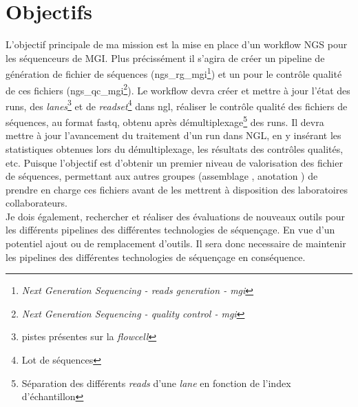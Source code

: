 \section{Objectifs}
L'objectif principale de ma mission est la mise en place d'un workflow NGS pour les séquenceurs de MGI. Plus précissément il s'agira de créer un pipeline de génération de fichier de séquences (ngs\_rg\_mgi\footnote{\emph{Next Generation Sequencing - reads generation - mgi}}) et un pour le contrôle qualité de ces fichiers (ngs\_qc\_mgi\footnote{\emph{Next Generation Sequencing - quality control - mgi}}). Le workflow devra créer et mettre à jour l'état des runs, des \emph{lanes}\footnote{pistes présentes sur la \emph{flowcell}} et de \emph{readset}\footnote{Lot de séquences} dans ngl, réaliser le contrôle qualité des fichiers de séquences, au format fastq, obtenu après démultiplexage\footnote{Séparation des différents \emph{reads} d'une \emph{lane} en fonction de l'index d'échantillon} des runs. Il devra mettre à jour l'avancement du traitement d'un run dans NGL, en y insérant les statistiques obtenues lors du démultiplexage, les résultats des contrôles qualités, etc. Puisque l'objectif est d'obtenir un premier niveau de valorisation des fichier de séquences, permettant aux autres groupes (\og assemblage \fg{}, \og anotation \fg{}) de prendre en charge ces fichiers avant de les mettrent à disposition des laboratoires collaborateurs.\\

Je dois également, rechercher et réaliser des évaluations de nouveaux outils pour les différents pipelines des différentes technologies de séquençage. En vue d'un potentiel ajout ou de remplacement d'outils. Il sera donc necessaire de maintenir les pipelines des différentes technologies de séquençage en conséquence.